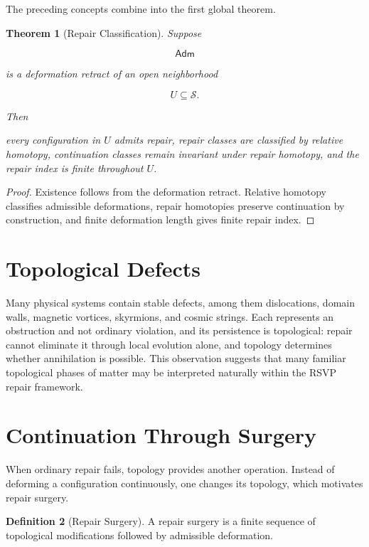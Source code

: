 \documentclass[11pt,oneside]{book}
\numberwithin{equation}{chapter}
\theoremstyle{definition}
\newtheorem{definition}{Definition}[chapter]
\theoremstyle{plain}
\newtheorem{theorem}[definition]{Theorem}
\newcommand{\State}{\mathcal{S}}
\newcommand{\Adm}{\mathsf{Adm}}
\begin{document}
The preceding concepts combine into the first global theorem.

\begin{theorem}[Repair Classification]

Suppose

\[
\Adm
\]

is a deformation retract of an open neighborhood

\[
U
\subseteq
\State.
\]

Then

every configuration in \(U\) admits repair, repair classes are classified by relative homotopy, continuation classes remain invariant under repair homotopy, and the repair index is finite throughout \(U\).

\end{theorem}

\begin{proof}

Existence follows from the deformation retract. Relative homotopy classifies admissible deformations, repair homotopies preserve continuation by construction, and finite deformation length gives finite repair index.

\end{proof}

\section{Topological Defects}

Many physical systems contain stable defects, among them dislocations, domain walls, magnetic vortices, skyrmions, and cosmic strings. Each represents an obstruction and not ordinary violation, and its persistence is topological: repair cannot eliminate it through local evolution alone, and topology determines whether annihilation is possible. This observation suggests that many familiar topological phases of matter may be interpreted naturally within the RSVP repair framework.

\section{Continuation Through Surgery}

When ordinary repair fails, topology provides another operation. Instead of deforming a configuration continuously, one changes its topology, which motivates repair surgery.

\begin{definition}[Repair Surgery]

A repair surgery is a finite sequence of topological modifications followed
by admissible deformation.

\end{definition}
\end{document}
